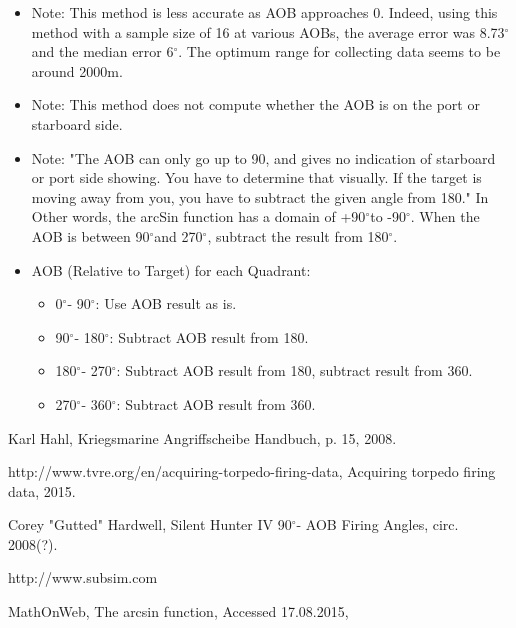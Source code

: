 \documentclass{article}
\newcommand{\degree}{$^{\circ}$}
\begin{document}
\begin{itemize}
\item{Note: This method is less accurate as AOB approaches 0. Indeed, using this method with a sample size of 16 at various AOBs, the average error was 8.73\degree and the median error 6\degree. The optimum range for collecting data seems to be around 2000m.}
\item{Note: This method does not compute whether the AOB is on the port or starboard side.}
\item{Note: "The AOB can only go up to 90, and gives no indication of starboard or port side showing. You have to determine that visually. If the target is moving away from you, you have to subtract the given angle from 180."\cite[p~15]{angrHandB, tvreAcqData} In Other words, the arcSin function has a domain of +90\degree to -90\degree. When the AOB is between 90\degree and 270\degree, subtract the result from 180\degree. \cite{arcSin}}

\item{AOB (Relative to Target) for each Quadrant:}
\begin{itemize}
	\item{0\degree - 90\degree : Use AOB result as is.}
	\item{90\degree - 180\degree : Subtract AOB result 				 from 180.}
	\item{180\degree - 270\degree : Subtract AOB result from 180, subtract result from 360.}
	\item{270\degree - 360\degree : Subtract AOB result from 360.}
	\end{itemize}

\end{itemize}

\begin{thebibliography}{9}

  Karl Hahl,
  Kriegsmarine Angriffscheibe Handbuch,
  p. 15,
  2008.
  
http://www.tvre.org/en/acquiring-torpedo-firing-data,
Acquiring torpedo firing data,
2015.

Corey "Gutted" Hardwell,
Silent Hunter IV 90\degree - AOB Firing Angles,
circ. 2008(?).

http://www.subsim.com

MathOnWeb,
The arcsin function,
Accessed 17.08.2015,


\end{thebibliography}
\end{document}

